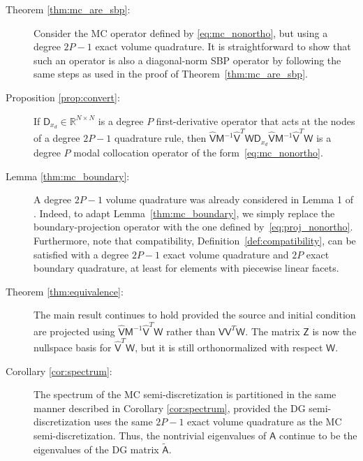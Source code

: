 \documentclass[pdflatex,sn-mathphys-num]{sn-jnl}%
\theoremstyle{thmstyleone}%
\theoremstyle{thmstyletwo}%
\theoremstyle{thmstylethree}%
\newcommand{\mat}[1]{\ensuremath{\mathsf{#1}}}
\begin{document}
\begin{description}
\item[Theorem \ref{thm:mc_are_sbp}:] Consider the MC operator defined by \eqref{eq:mc_nonortho}, but using a degree $2P-1$ exact volume quadrature.  It is straightforward to show that such an operator is also a diagonal-norm SBP operator by following the same steps as used in the proof of Theorem~\ref{thm:mc_are_sbp}.

\item[Proposition \ref{prop:convert}:] If $\mat{D}_{x_d} \in \mathbb{R}^{N\times N}$ is a degree $P$ first-derivative operator that acts at the nodes of a degree $2P-1$ quadrature rule, then $\hat{\mat{V}} \mat{M}^{-1} \hat{\mat{V}}^T \mat{W} \mat{D}_{x_d} \hat{\mat{V}} \mat{M}^{-1} \hat{\mat{V}}^T \mat{W}$ is a degree $P$ modal collocation operator of the form~\eqref{eq:mc_nonortho}.

\item[Lemma \ref{thm:mc_boundary}:] A degree $2P-1$ volume quadrature was already considered in Lemma 1 of \cite{Chan2018discretely}.  Indeed, to adapt Lemma~\ref{thm:mc_boundary}, we simply replace the boundary-projection operator with the one defined by~\eqref{eq:proj_nonortho}.  Furthermore, note that compatibility, Definition~\ref{def:compatibility}, can be satisfied with a degree $2P-1$ exact volume quadrature and $2P$ exact boundary quadrature, at least for elements with piecewise linear facets.

\item[Theorem \ref{thm:equivalence}:] The main result continues to hold provided the source and initial condition are projected using $\hat{\mat{V}} \mat{M}^{-1} \hat{\mat{V}}^T \mat{W}$ rather than $\mat{V} \mat{V}^T \mat{W}$.  The matrix $\mat{Z}$ is now the nullspace basis for $\hat{\mat{V}}^T \mat{W}$, but it is still orthonormalized with respect $\mat{W}$.

\item[Corollary \ref{cor:spectrum}:] The spectrum of the MC semi-discretization is partitioned in the same manner described in Corollary \ref{cor:spectrum}, provided the DG semi-discretization uses the same $2P-1$ exact volume quadrature as the MC semi-discretization.  Thus, the nontrivial eigenvalues of $\mat{A}$ continue to be the eigenvalues of the DG matrix $\tilde{\mat{A}}$.
\end{description}
\end{document}
